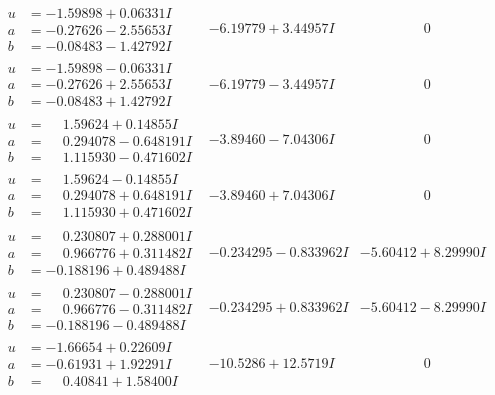\documentclass[1p]{elsarticle_modified}
\theoremstyle{definition}
\begin{document}
$$\begin{array}{c|c|c}
\begin{aligned}
u &= -1.59898 + 0.06331 I \\
a &= -0.27626 - 2.55653 I \\
b &= -0.08483 - 1.42792 I\end{aligned}
 & -6.19779 + 3.44957 I & \phantom{-0.000000 } 0 \\ \hline\begin{aligned}
u &= -1.59898 - 0.06331 I \\
a &= -0.27626 + 2.55653 I \\
b &= -0.08483 + 1.42792 I\end{aligned}
 & -6.19779 - 3.44957 I & \phantom{-0.000000 } 0 \\ \hline\begin{aligned}
u &= \phantom{-}1.59624 + 0.14855 I \\
a &= \phantom{-}0.294078 - 0.648191 I \\
b &= \phantom{-}1.115930 - 0.471602 I\end{aligned}
 & -3.89460 - 7.04306 I & \phantom{-0.000000 } 0 \\ \hline\begin{aligned}
u &= \phantom{-}1.59624 - 0.14855 I \\
a &= \phantom{-}0.294078 + 0.648191 I \\
b &= \phantom{-}1.115930 + 0.471602 I\end{aligned}
 & -3.89460 + 7.04306 I & \phantom{-0.000000 } 0 \\ \hline\begin{aligned}
u &= \phantom{-}0.230807 + 0.288001 I \\
a &= \phantom{-}0.966776 + 0.311482 I \\
b &= -0.188196 + 0.489488 I\end{aligned}
 & -0.234295 - 0.833962 I & -5.60412 + 8.29990 I \\ \hline\begin{aligned}
u &= \phantom{-}0.230807 - 0.288001 I \\
a &= \phantom{-}0.966776 - 0.311482 I \\
b &= -0.188196 - 0.489488 I\end{aligned}
 & -0.234295 + 0.833962 I & -5.60412 - 8.29990 I \\ \hline\begin{aligned}
u &= -1.66654 + 0.22609 I \\
a &= -0.61931 + 1.92291 I \\
b &= \phantom{-}0.40841 + 1.58400 I\end{aligned}
 & -10.5286 + 12.5719 I & \phantom{-0.000000 } 0 \\ \hline\begin{aligned}

\end{aligned}
\end{array}$$
\end{document}
